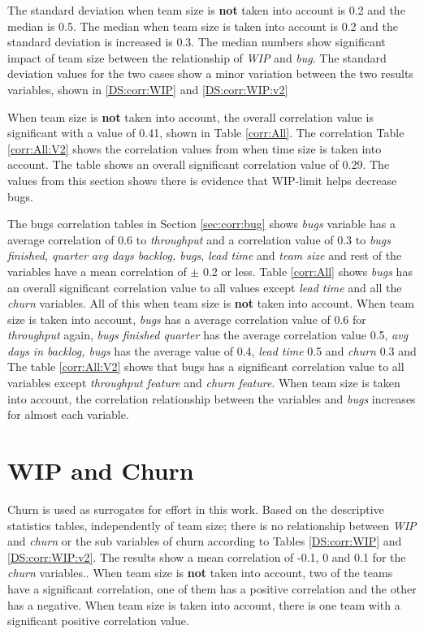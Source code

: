 \documentclass[UKenglish]{ifimaster}  %
\begin{document}
The standard deviation when team size is \textbf{not} taken into account is 0.2 and the median is 0.5. The median when team size is taken into account is 0.2 and the standard deviation is increased is 0.3. The median numbers show significant impact of team size between the relationship of \textit{WIP} and \textit{bug}. The standard deviation values for the two cases show a minor variation between the two results variables, shown in \ref{DS:corr:WIP} and \ref{DS:corr:WIP:v2}    

When team size is \textbf{not} taken into account, the overall correlation value is significant with a value of  0.41, shown in Table \ref{corr:All}.  The correlation Table \ref{corr:All:V2} shows the correlation values from when time size is taken into account. The table shows an overall significant correlation value of 0.29. The values from this section shows there is evidence that WIP-limit helps decrease bugs.

The bugs correlation tables in Section  \ref{sec:corr:bug} shows \textit{bugs} variable has a average correlation of 0.6 to \textit{throughput} and a correlation value of 0.3 to \textit{bugs finished, quarter} \textit{avg days backlog, bugs}, \textit{lead time} and \textit{team size} and rest of the variables have a mean correlation of $\pm$ 0.2 or less. Table \ref{corr:All} shows \textit{bugs} has an overall significant correlation value to all values except \textit{lead time} and all the \textit{churn} variables. All of this when team size is \textbf{not} taken into account. When team size is taken into account, \textit{bugs} has a average correlation value of 0.6 for \textit{throughput} again, \textit{bugs finished quarter} has the average correlation value 0.5, \textit{avg days in backlog, bugs} has the average value of 0.4, \textit{lead time} 0.5 and \textit{churn} 0.3 and The table \ref{corr:All:V2} shows that bugs has a significant correlation value to all variables except \textit{throughput feature} and \textit{churn feature}.  When team size is taken into account, the correlation relationship between the variables and \textit{bugs} increases for almost each variable.



\section{WIP and Churn}
Churn is used as surrogates for effort in this work. Based on the descriptive statistics tables, independently of  team size; there is no relationship between \textit{WIP} and \textit{churn} or the sub variables of churn according to Tables \ref{DS:corr:WIP} and \ref{DS:corr:WIP:v2}. The results show a mean correlation of -0.1, 0 and 0.1 for the \textit{churn} variables.. When team size is \textbf{not} taken into account, two of the teams have a significant correlation, one of them has a positive correlation and the other has a negative. When team size is taken into account, there is one team with a significant positive correlation value.
\end{document}
